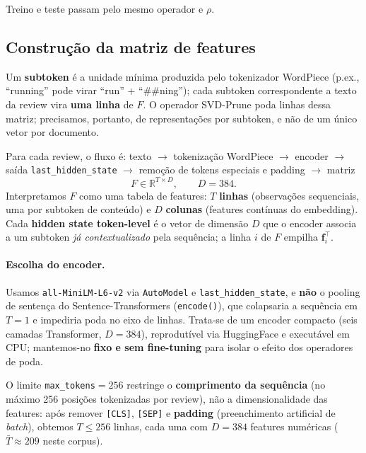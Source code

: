 Treino e teste passam pelo mesmo operador e $\rho$.

\subsection{Construção da matriz de features}\label{sec:construcao-f}

Um \textbf{subtoken} é a unidade mínima produzida pelo tokenizador WordPiece (p.ex., ``running'' pode virar ``run'' + ``##ning''); cada subtoken correspondente a texto da review vira \textbf{uma linha} de $F$. O operador SVD-Prune poda linhas dessa matriz; precisamos, portanto, de representações por subtoken, e não de um único vetor por documento.

Para cada review, o fluxo é: texto $\to$ tokenização WordPiece $\to$ encoder $\to$ saída \texttt{last\_hidden\_state} $\to$ remoção de tokens especiais e padding $\to$ matriz
$$
F \in \mathbb{R}^{T \times D}, \qquad D = 384.
$$
Interpretamos $F$ como uma tabela de features: $T$ \textbf{linhas} (observações sequenciais, uma por subtoken de conteúdo) e $D$ \textbf{colunas} (features contínuas do embedding). Cada \textbf{hidden state token-level} é o vetor de dimensão $D$ que o encoder associa a um subtoken \emph{já contextualizado} pela sequência; a linha $i$ de $F$ empilha $\mathbf{f}_i^\top$.

\paragraph{Escolha do encoder.}
Usamos \texttt{all-MiniLM-L6-v2} via \texttt{AutoModel} e \texttt{last\_hidden\_state}, e \textbf{não} o pooling de sentença do Sentence-Transformers (\texttt{encode()}), que colapsaria a sequência em $T=1$ e impediria poda no eixo de linhas. Trata-se de um encoder compacto (seis camadas Transformer, $D=384$), reprodutível via HuggingFace e executável em CPU; mantemos-no \textbf{fixo e sem fine-tuning} para isolar o efeito dos operadores de poda.

O limite \texttt{max\_tokens}$=256$ restringe o \textbf{comprimento da sequência} (no máximo 256 posições tokenizadas por review), não a dimensionalidade das features: após remover \texttt{[CLS]}, \texttt{[SEP]} e \textbf{padding} (preenchimento artificial de \emph{batch}), obtemos $T \leq 256$ linhas, cada uma com $D=384$ features numéricas ($\bar{T}\approx 209$ neste corpus).

